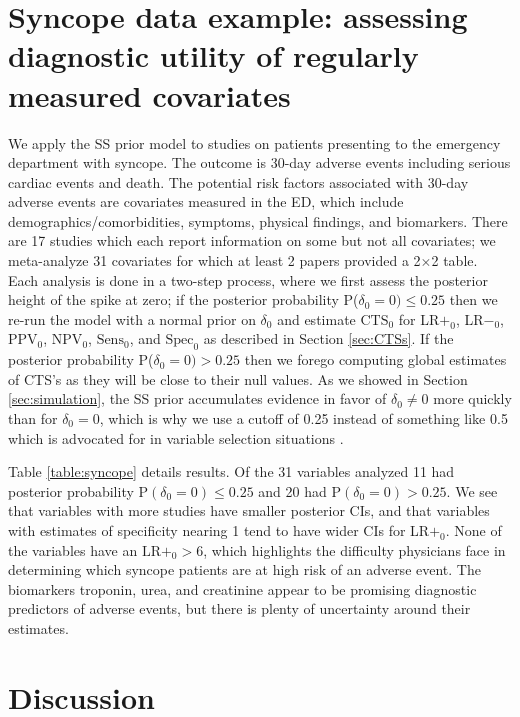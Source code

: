 \documentclass[AMA,STIX1COL]{WileyNJD-v2}
\begin{document}
\section{Syncope data example: assessing diagnostic utility of regularly measured covariates} \label{sec:syncope}

We apply the SS prior model to studies on patients presenting to the emergency department with syncope. The outcome is 30-day adverse events including serious cardiac events and death. The potential risk factors associated with 30-day adverse events are covariates measured in the ED, which include demographics/comorbidities, symptoms, physical findings, and biomarkers. There are 17 studies which each report information on some but not all covariates; we meta-analyze 31 covariates for which at least 2 papers provided a 2$\times$2 table. Each analysis is done in a two-step process, where we first assess the posterior height of the spike at zero; if the posterior probability P($\delta_0 = 0) \le 0.25$ then we re-run the model with a normal prior on $\delta_0$ and estimate $\mbox{CTS}_0$ for LR$+_0$, LR$-_0$, $\mbox{PPV}_0$, $\mbox{NPV}_0$, $\mbox{Sens}_0$, and $\mbox{Spec}_0$ as described in Section \ref{sec:CTSs}. If the posterior probability P($\delta_0 = 0) > 0.25$ then we forego computing global estimates of CTS's as they will be close to their null values. As we showed in Section \ref{sec:simulation}, the SS prior accumulates evidence in favor of $\delta_0 \ne 0$ more quickly than for $\delta_0 = 0$, which is why we use a cutoff of 0.25 instead of something like 0.5 which is advocated for in variable selection situations \citep{barbieri2004}. 

Table \ref{table:syncope} details results. Of the 31 variables analyzed 11 had posterior probability $\mbox{P}(\delta_0 = 0) \le 0.25$ and 20 had $\mbox{P}(\delta_0 = 0) > 0.25$. We see that variables with more studies have smaller posterior CIs, and that variables with estimates of specificity nearing 1 tend to have wider CIs for LR$+_0$. None of the variables have an $\mbox{LR}+_0 > 6$, which highlights the difficulty physicians face in determining which syncope patients are at high risk of an adverse event. The biomarkers troponin, urea, and creatinine appear to be promising diagnostic predictors of adverse events, but there is plenty of uncertainty around their estimates. 

\section{Discussion}
\end{document}

